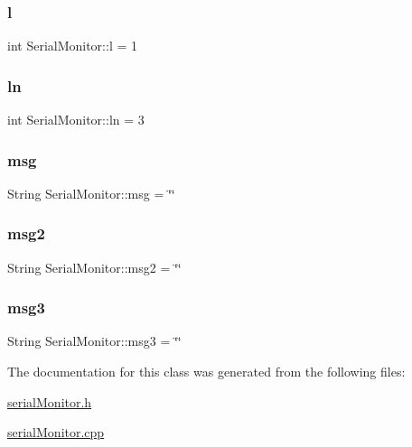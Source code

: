 \subsubsection{\texorpdfstring{l}{l}}
{\footnotesize\ttfamily int Serial\+Monitor\+::l = 1}

\mbox{\label{class_serial_monitor_a927d39734bc5a2f14d2410166c3ad7d8}} 
\subsubsection{\texorpdfstring{ln}{ln}}
{\footnotesize\ttfamily int Serial\+Monitor\+::ln = 3}

\mbox{\label{class_serial_monitor_ad8d79dfef8beca9a49c79d70a762f11f}} 
\subsubsection{\texorpdfstring{msg}{msg}}
{\footnotesize\ttfamily String Serial\+Monitor\+::msg = \char`\"{}\char`\"{}}

\mbox{\label{class_serial_monitor_a3435a73fe22d7df05cae997dc8154118}} 
\subsubsection{\texorpdfstring{msg2}{msg2}}
{\footnotesize\ttfamily String Serial\+Monitor\+::msg2 = \char`\"{}\char`\"{}}

\mbox{\label{class_serial_monitor_acb11ddb2153fc4af57e25ea0aec58991}} 
\subsubsection{\texorpdfstring{msg3}{msg3}}
{\footnotesize\ttfamily String Serial\+Monitor\+::msg3 = \char`\"{}\char`\"{}}



The documentation for this class was generated from the following files\+:\begin{DoxyCompactItemize}
\item 
\hyperlink{serial_monitor_8h}{serial\+Monitor.\+h}\item 
\hyperlink{serial_monitor_8cpp}{serial\+Monitor.\+cpp}\end{DoxyCompactItemize}

